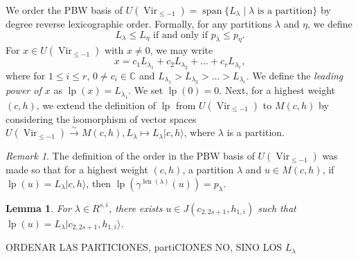 \documentclass[a4paper, 12pt, reqno]{amsart}
\newtheorem{lemma}[theorem]{Lemma}
\theoremstyle{remark}
\newtheorem{remark}[theorem]{Remark}
\DeclareMathOperator{\Vir}{Vir}
\DeclareMathOperator{\len}{len}
\DeclareMathOperator{\vspan}{span}
\DeclareMathOperator{\lp}{lp}
\begin{document}
We order the PBW basis of $U(\Vir_{\le -1}) = \vspan\{L_{\lambda} \mid \text{$\lambda$ is a partition}\}$ by degree reverse lexicographic order.
Formally, for any partitions $\lambda$ and $\eta$, we define
\begin{equation*}
  L_{\lambda} \le L_{\eta}\text{ if and only if }p_{\lambda} \le p_{\eta}.
\end{equation*}
For $x \in U(\Vir_{\le -1})$ with $x \neq 0$, we may write
\begin{equation*}
  x = c_1L_{\lambda_1} + c_2L_{\lambda_2} + \dots + c_rL_{\lambda_r},
\end{equation*}
where for $1 \le i \le r$, $0 \neq c_i \in \mathbb{C}$ and $L_{\lambda_1} > L_{\lambda_2} > \dots > L_{\lambda_r}$.
We define the \emph{leading power of $x$} as $\lp(x) = L_{\lambda_1}$.
We set $\lp(0) = 0$.
Next, for a highest weight $(c, h)$, we extend the definition of $\lp$ from $U(\Vir_{\le -1})$ to $M(c, h)$ by considering the isomorphism of vector spaces $U(\Vir_{\le -1}) \xrightarrow{\sim} M(c, h), L_{\lambda} \mapsto L_{\lambda}|c, h\rangle$, where $\lambda$ is a partition.

\begin{remark}
  \label{rmk:6}
  The definition of the order in the PBW basis of $U(\Vir_{\le -1})$ was made so that for a highest weight $(c, h)$, a partition $\lambda$ and $u \in M(c, h)$, if $\lp(u) = L_{\lambda}|c, h\rangle$, then $\lp(\gamma^{\len(\lambda)}(u)) = p_{\lambda}$.
\end{remark}

\begin{lemma}
  \label{lmm:3}
  For $\lambda \in R^{s, i}$, there exists $u \in J(c_{2, 2s + 1}, h_{1, i})$ such that $\lp(u) = L_{\lambda}|c_{2, 2s + 1}, h_{1, i}\rangle$.
\end{lemma}

ORDENAR LAS PARTICIONES, partiCIONES NO, SINO LOS $L_\lambda$
\end{document}

